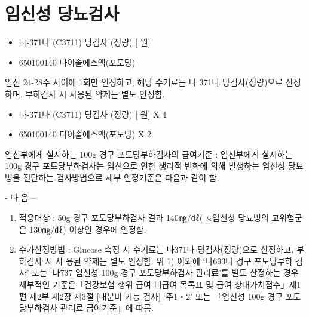 \section{임신성 당뇨검사} 
{
\begin{itemize}\tightlist
\item[\dschemical] 나-371나 (C3711) 당검사 (정량) [ 원]
\item[\dschemical] 650100140 다이솔에스액(포도당)
\end{itemize}
}
{
임신 24-28주 사이에 1회만 인정하고, 해당 수기료는 나 371나 당검사(정량)으로 산정하며, 부하검사 시 사용된 약제는 별도 인정함.
}
\prezi{\clearpage}

{
\begin{itemize}\tightlist
\item[\dschemical] 나-371나 (C3711) 당검사 (정량) [ 원] X 4
\item[\dschemical] 650100140 다이솔에스액(포도당) X 2
\end{itemize}
}
{
임신부에게 실시하는 100g 경구 포도당부하검사의 급여기준 : 임신부에게 실시하는 100g 경구 포도당부하검사는 임신으로 인한 생리적 변화에 의해 발생하는 임신성 당뇨병을 진단하는 검사방법으로 세부 인정기준은 다음과 같이 함. \par
      - 다 음 – 
\begin{enumerate}[가.]\tightlist
\item 적용대상 : 50g 경구 포도당부하검사 결과 140㎎/㎗( ※임신성 당뇨병의 고위험군 은 130㎎/㎗) 이상인 경우에 인정함. 
\item 수가산정방법 : Glucose 측정 시 수기료는 나371나 당검사(정량)으로 산정하고, 부하검사 시 사 용된 약제는 별도 인정함. 
위 1) 이외에 ‘나693나 경구 포도당부하 검사’ 또는 ‘나737 임신성 100g 경구 포도당부하검사 관리료’를 별도 산정하는 경우 세부적인 기준은「건강보험 행위 급여\cntrdot{} 비급여 목록표 및 급여 상대가치점수」제1편 제2부 제2장 제3절 [내분비 기능 검사] ‘주1‧2’ 또는 「임신성 100g 경구 포도당부하검사 관리료 급여기준」에 따름. 
\end{enumerate}
}


